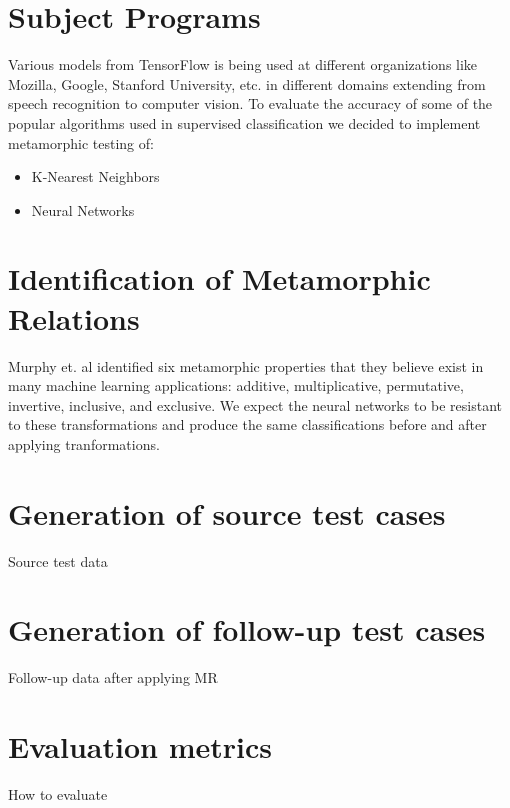 \section{Subject Programs}
Various models from TensorFlow is being used at different organizations like Mozilla, Google, Stanford University, etc. in different domains extending from speech recognition to computer vision. To evaluate the accuracy of some of the popular algorithms used in supervised classification we decided to implement metamorphic testing of:
\begin{itemize}
\item K-Nearest Neighbors
\item Neural Networks
\end{itemize}

\section{Identification of Metamorphic Relations} \label{MRused}
Murphy et. al identified six metamorphic properties that they believe exist in many machine learning applications: additive, multiplicative, permutative, invertive, inclusive, and exclusive. We expect the neural networks to be resistant to these transformations and produce the same classifications before and after applying tranformations.

\section{Generation of source test cases}
Source test data

\section{Generation of follow-up test cases}
Follow-up data after applying MR

\section{Evaluation metrics}
How to evaluate
